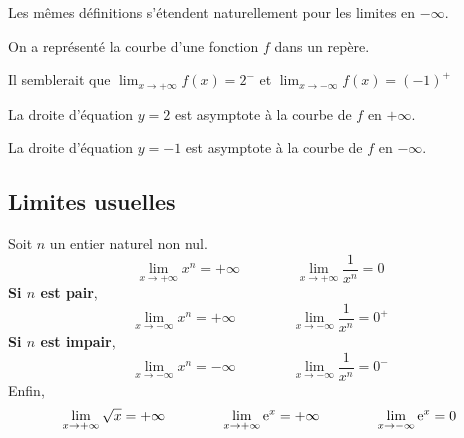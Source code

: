 \documentclass[11pt,fleqn, openany]{book} %
\begin{document}
Les mêmes définitions s'étendent naturellement pour les limites en $-\infty$.

\begin{example}On a représenté la courbe d'une fonction $f$ dans un repère.

\begin{minipage}{0.65\linewidth}
Il semblerait que $\displaystyle\lim_{x\to +\infty}f(x)=2^-$ et $\displaystyle\lim_{x\to -\infty}f(x)=(-1)^+$

La droite d'équation $y=2$ est asymptote à la courbe de $f$ en $+\infty$.

La droite d'équation $y=-1$ est asymptote à la courbe de $f$ en $-\infty$.
\end{minipage}\hfill \begin{minipage}{0.3\linewidth}
\begin{flushright}

\end{flushright}\end{minipage}\end{example}


\subsection{Limites usuelles}

\begin{proposition}Soit $n$ un entier naturel non nul.
\[\displaystyle \lim_{x \to +\infty} x^n = +\infty \qquad \qquad \displaystyle \lim_{x \to +\infty} \dfrac{1}{x^n} = 0\]
\textbf{Si $n$ est pair}, \[\displaystyle \lim_{x \to -\infty} x^n = +\infty \qquad \qquad \displaystyle \lim_{x \to -\infty} \dfrac{1}{x^n}=0^+\]
\textbf{Si $n$ est impair}, 
\[\displaystyle \lim_{x \to -\infty} x^n = -\infty \qquad \qquad \displaystyle \lim_{x \to -\infty} \dfrac{1}{x^n}=0^-\]
Enfin, 
\[\displaystyle \lim_{x \to +\infty} \sqrt{x} = +\infty \qquad \qquad \displaystyle \lim_{x \to +\infty} \mathrm{e}^x = +\infty \qquad \qquad \displaystyle \lim_{x \to -\infty} \mathrm{e}^x = 0\]
\end{proposition}
\end{document}
